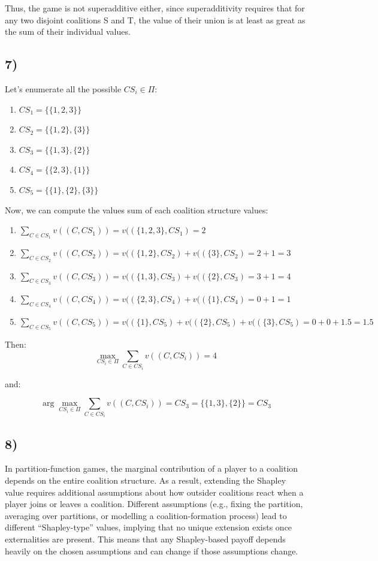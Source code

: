 \documentclass[10pt]{article}
\begin{document}
Thus, the game is not superadditive either, since superadditivity requires that for any two disjoint coalitions S and T, the value of their union is at least as great as the sum of their individual values.

\subsection*{7)}

Let's enumerate all the possible $CS_i \in \Pi$:

\begin{enumerate}
\item $CS_{1} = \{\{1,2,3\}\}$
\item $CS_{2} = \{\{1,2\},\{3\}\}$
\item $CS_{3} = \{\{1,3\},\{2\}\}$
\item $CS_{4} = \{\{2,3\},\{1\}\}$
\item $CS_{5} = \{\{1\},\{2\},\{3\}\}$
\end{enumerate}

Now, we can compute the values sum of each coalition structure values:

\begin{enumerate}
\item $\sum_{C \in CS_{1}} v((C, CS_{1})) = v((\{1,2,3\}, CS_{1}) = 2$
\item $\sum_{C \in CS_{2}} v((C, CS_{2})) = v((\{1,2\}, CS_{2}) + v((\{3\}, CS_{2}) = 2 + 1 = 3$
\item $\sum_{C \in CS_{3}} v((C, CS_{3})) = v((\{1,3\}, CS_{3}) + v((\{2\}, CS_{3}) = 3 + 1 = 4$
\item $\sum_{C \in CS_{4}} v((C, CS_{4})) = v((\{2,3\}, CS_{4}) + v((\{1\}, CS_{4}) = 0 + 1 = 1$
\item $\sum_{C \in CS_{5}} v((C, CS_{5})) = v((\{1\}, CS_{5}) + v((\{2\}, CS_{5}) + v((\{3\}, CS_{5}) = 0 + 0 + 1.5 = 1.5$
\end{enumerate}

Then:
\[\max_{CS_{i} \in \Pi} \sum_{C \in CS_{i}} v((C, CS_{i})) = 4\]

and:

\[\arg\max_{CS_{i} \in \Pi} \sum_{C \in CS_{i}} v((C, CS_{i})) = CS_{3} = \{\{1,3\},\{2\}\} = CS_{3}\]

\subsection*{8)}

In partition-function games, the marginal contribution of a player to a coalition depends on the entire coalition structure. As a result, extending the Shapley value requires additional assumptions about how outsider coalitions react when a player joins or leaves a coalition. Different assumptions (e.g., fixing the partition, averaging over partitions, or modelling a coalition-formation process) lead to different “Shapley-type” values, implying that no unique extension exists once externalities are present. This means that any Shapley-based payoff depends heavily on the chosen assumptions and can change if those assumptions change.
\end{document}
